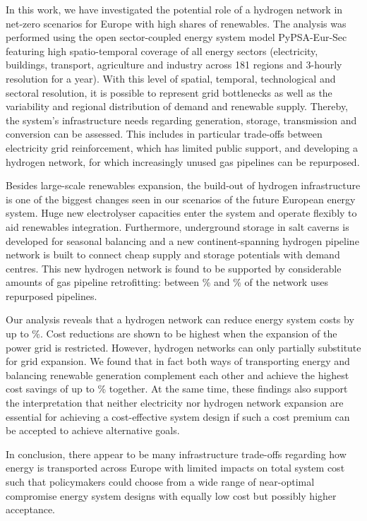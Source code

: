 In this work, we have investigated the potential role of a hydrogen network in
net-zero \co scenarios for Europe with high shares of renewables. The analysis
was performed using the open sector-coupled energy system model PyPSA-Eur-Sec
featuring high spatio-temporal coverage of all energy sectors (electricity,
buildings, transport, agriculture and industry across 181 regions and 3-hourly
resolution for a year). With this level of spatial, temporal, technological and
sectoral resolution, it is possible to represent grid bottlenecks as well as the
variability and regional distribution of demand and renewable supply. Thereby,
the system's infrastructure needs regarding generation, storage, transmission
and conversion can be assessed. This includes in particular trade-offs between
electricity grid reinforcement, which has limited public support, and developing
a hydrogen network, for which increasingly unused gas pipelines can be
repurposed.

Besides large-scale renewables expansion, the build-out of hydrogen
infrastructure is one of the biggest changes seen in our scenarios of the future
European energy system. Huge new electrolyser capacities enter the system and
operate flexibly to aid renewables integration. Furthermore, underground storage
in salt caverns is developed for seasonal balancing and a new continent-spanning
hydrogen pipeline network is built to connect cheap supply and storage
potentials with demand centres. This new hydrogen network is found to be
supported by considerable amounts of gas pipeline retrofitting: between
\minretroshare\% and \maxretroshare\% of the network uses repurposed pipelines.

Our analysis reveals that a hydrogen network can reduce energy system costs by
up to \maxhybenefitrel\%. Cost reductions are shown to be highest when the
expansion of the power grid is restricted. However, hydrogen networks can only
partially substitute for grid expansion. We found that in fact both ways of
transporting energy and balancing renewable generation complement each other and
achieve the highest cost savings of up to \gridbenefitrel\% together. At the
same time, these findings also support the interpretation that neither
electricity nor hydrogen network expansion are essential for achieving a
cost-effective system design if such a cost premium can be accepted to achieve
alternative goals.

In conclusion, there appear to be many infrastructure trade-offs regarding how
energy is transported across Europe with limited impacts on total system cost
such that policymakers could choose from a wide range of near-optimal compromise
energy system designs with equally low cost but possibly higher acceptance.

